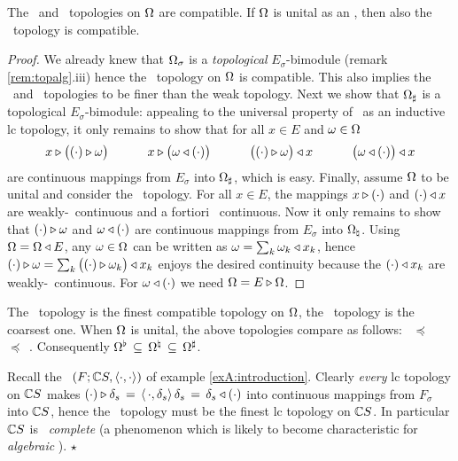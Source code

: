 \begin{prop} \label{prop:three_topologies_are_compatible}
  The \strictw\ and \stricta\ topologies on $\Omega$ are \EEdash compatible.
  If\/ $\Omega$ is unital as an \Ebimod, then also the \strictm\ topology is \EEdash compatible.
\end{prop}
\begin{proof}
We already knew that $\Omega_\sigma$ is a {\em topological\/} $E_\sigma$-bimodule
(remark \ref{rem:topalg}.iii) hence the \strictw\ topology on $\Omega$ is \EEdash compatible.
This also implies the \strictm\ and \stricta\ topologies to be finer than the weak topology.
Next we show that $\Omega_\sharp$ is a topological $E_\sigma$-bimodule:
appealing to the universal property of \stricta\ as an inductive {\sc lc} topology,
it only remains to show that for all $x\in E$ and $\omega \in \Omega$
$$  x\lact \left(\vertM (\cdot) \lact \om\right)     \hspace{3em}
    x\lact \left(\vertM \om\ract (\cdot) \right)      \hspace{3em}
    \left(\vertM (\cdot) \lact \om \right) \ract x    \hspace{3em}
    \left(\vertM \om \ract (\cdot) \right) \ract x $$
are continuous mappings from $E_\sigma$ into $\Omega_\sharp$, which is easy.
%
Finally, assume $\Omega$ to be unital and consider the \strictm\ topology.
For all $x \in E$, the mappings $x\triangleright (\cdot)$ and $(\cdot) \triangleleft x$
are weakly-\strictm\ continuous and a fortiori \strictm\ continuous.
Now it only remains to show that $(\cdot) \triangleright \omega$ and $\omega \triangleleft (\cdot)$
are continuous mappings from $E_\sigma$ into $\Omega_\natural$.
Using $\Omega=\Omega \triangleleft E$, any $\omega \in\Omega$ can be written as $\omega = \sum_k \omega_k \triangleleft x_k$,
hence $(\cdot) \lact \om = \sum_k \left(\vertM (\cdot) \lact \om_k \right) \ract x_k$
enjoys the desired continuity because the $(\cdot) \triangleleft x_k$
are weakly-\strictm\ continuous. For $\omega \triangleleft (\cdot)$ we need $\Omega=E \triangleright \Omega$.
\end{proof}


\begin{cor}  \label{cor:finest_EEcompatible}
  The \stricta\ topology is the finest \EEdash compatible topology on $\Omega$,
  the \strictw\ topology is the coarsest one.
  When $\Omega$ is unital, the above topologies compare as follows:
  \mbox{\strictw\ $\preceq$ \strictm\ $\preceq$ \stricta}\@.
  Consequently $\Omega^\flat \,\subseteq \,\Omega^\natural \,\subseteq \,\Omega^\sharp$.
\end{cor}


\begin{exA}  \rm
  Recall the \context\ $(F; \mathbb{C} S, \langle\cdot, \cdot\rangle)$ of example \ref{exA:introduction}\@.
  Clearly {\em every\/} {\sc lc} topology on $\mathbb{C} S$ makes
  $(\cdot) \triangleright \delta_s  \,=\, \langle \,\cdot,\delta_s \rangle \, \delta_s
                           \,=\, \delta_s \triangleleft (\cdot)$
  into continuous mappings from $F_\sigma$ into $\mathbb{C} S$,
  hence the \stricta\ topology must be the finest {\sc lc} topology on $\mathbb{C} S$.
  In particular $\mathbb{C} S$ is \stricta\ {\em complete\/} (a phenomenon which is likely
  to become characteristic for {\em algebraic\/} \contexts).
  \hfill $\star$
\end{exA}

